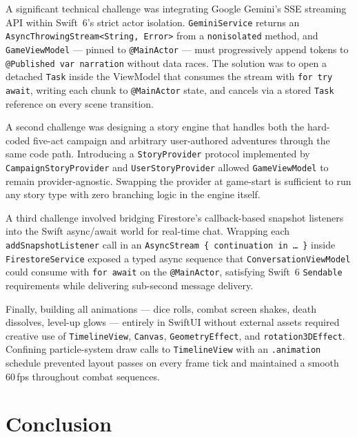 \documentclass[12pt,a4paper]{article}
\begin{document}
\begin{sloppypar}
A significant technical challenge was integrating Google Gemini's SSE streaming API within Swift~6's strict actor isolation. \texttt{GeminiService} returns an \texttt{AsyncThrowingStream<String, Error>} from a \texttt{nonisolated} method, and \texttt{GameViewModel} — pinned to \texttt{@MainActor} — must progressively append tokens to \texttt{@Published var narration} without data races. The solution was to open a detached \texttt{Task} inside the ViewModel that consumes the stream with \texttt{for try await}, writing each chunk to \texttt{@MainActor} state, and cancels via a stored \texttt{Task} reference on every scene transition.

A second challenge was designing a story engine that handles both the hard-coded five-act campaign and arbitrary user-authored adventures through the same code path. Introducing a \texttt{StoryProvider} protocol implemented by \texttt{CampaignStoryProvider} and \texttt{UserStoryProvider} allowed \texttt{GameViewModel} to remain provider-agnostic. Swapping the provider at game-start is sufficient to run any story type with zero branching logic in the engine itself.

A third challenge involved bridging Firestore's callback-based snapshot listeners into the Swift async/await world for real-time chat. Wrapping each \texttt{addSnapshotListener} call in an \texttt{AsyncStream \{ continuation in \ldots{} \}} inside \texttt{FirestoreService} exposed a typed async sequence that \texttt{ConversationViewModel} could consume with \texttt{for await} on the \texttt{@MainActor}, satisfying Swift~6 \texttt{Sendable} requirements while delivering sub-second message delivery.

Finally, building all animations — dice rolls, combat screen shakes, death dissolves, level-up glows — entirely in SwiftUI without external assets required creative use of \texttt{TimelineView}, \texttt{Canvas}, \texttt{GeometryEffect}, and \texttt{rotation3DEffect}. Confining particle-system draw calls to \texttt{TimelineView} with an \texttt{.animation} schedule prevented layout passes on every frame tick and maintained a smooth 60\,fps throughout combat sequences.
\end{sloppypar}

\section{Conclusion}
\end{document}
